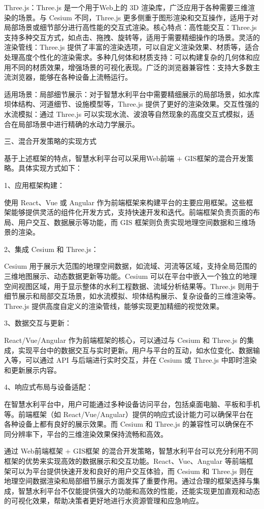 Three.js：Three.js 是一个用于Web上的 3D 渲染库，广泛应用于各种需要三维渲染的场景。与 Cesium 不同，Three.js 更多侧重于图形渲染和交互操作，适用于对局部场景或细节部分进行高性能的交互式渲染。核心特点：高性能交互：Three.js 支持多种交互方式，如点击、拖拽、旋转等，适用于需要精细操作的场景。灵活的渲染管线：Three.js 提供了丰富的渲染选项，可以自定义渲染效果、材质等，适合处理高度个性化的渲染需求。多种几何体和材质支持：可以构建复杂的几何体和应用不同的材质效果，增强场景的可视化表现。广泛的浏览器兼容性：支持大多数主流浏览器，能够在各种设备上流畅运行。

适用场景：局部细节展示：对于智慧水利平台中需要精细展示的局部场景，如水库坝体结构、河道细节、设施模型等，Three.js 提供了更好的渲染效果。交互性强的水流模拟：通过 Three.js 可以实现水流、波浪等自然现象的高度交互式模拟，适合在局部场景中进行精确的水动力学展示。

三、混合开发策略的实现方式

基于上述框架的特点，智慧水利平台可以采用Web前端 + GIS框架的混合开发策略。具体实现方式如下：

1、应用框架构建：

使用 React、Vue 或 Angular 作为前端框架来构建平台的主要应用框架。这些框架能够提供灵活的组件化开发方式，支持快速开发和迭代。前端框架负责页面的布局、用户交互、数据展示等功能，而 GIS 框架则负责实现地理空间数据和三维场景的渲染。

2、集成 Cesium 和 Three.js：

Cesium 用于展示大范围的地理空间数据，如流域、河流等区域，支持全局范围的三维地图展示、动态数据更新等功能。Cesium 可以在平台中嵌入一个独立的地理空间视图区域，用于显示整体的水利工程数据、流域分析结果等。Three.js 则用于细节展示和局部交互场景，如水流模拟、坝体结构展示、复杂设备的三维渲染等。Three.js 提供高度自定义的渲染管线，能够实现更加精细的视觉效果。

3、数据交互与更新：

React/Vue/Angular 作为前端框架的核心，可以通过与 Cesium 和 Three.js 的集成，实现平台中的数据交互与实时更新。用户与平台的互动，如水位变化、数据输入等，可以通过 API 与后端进行实时交互，并在 Cesium 或 Three.js 中即时渲染和更新展示内容。

4、响应式布局与设备适配：

在智慧水利平台中，用户可能通过多种设备访问平台，包括桌面电脑、平板和手机等。前端框架（如 React/Vue/Angular）提供的响应式设计能力可以确保平台在各种设备上都有良好的展示效果。而 Cesium 和 Three.js 的兼容性可以确保在不同分辨率下，平台的三维渲染效果保持流畅和高效。

通过 Web前端框架 + GIS框架 的混合开发策略，智慧水利平台可以充分利用不同框架的优势来实现高效的数据展示和交互功能。React、Vue、Angular 等前端框架可以为平台提供快速开发和良好的用户交互体验，而 Cesium 和 Three.js 则在地理空间数据渲染和局部细节展示方面发挥了重要作用。通过合理的框架选择与集成，智慧水利平台不仅能提供强大的功能和高效的性能，还能实现更加直观和动态的可视化效果，帮助决策者更好地进行水资源管理和应急响应。

